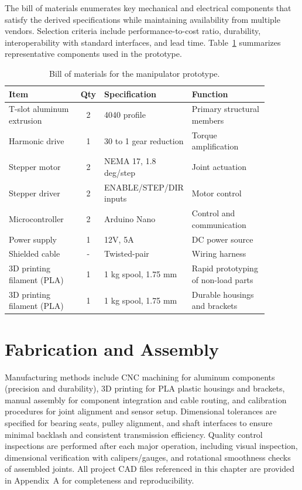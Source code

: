 The bill of materials enumerates key mechanical and electrical components that satisfy the derived specifications while maintaining
 availability from multiple vendors. Selection criteria include performance-to-cost ratio, durability, interoperability with standard 
 interfaces, and lead time. Table~\ref{tab:components_bom} summarizes representative components used in the prototype.

\begin{table}[H]
\centering
\caption{Bill of materials for the manipulator prototype.}
\label{tab:components_bom}
\begin{tabular}{|p{0.28\linewidth}|c|p{0.30\linewidth}|p{0.30\linewidth}|}
\hline
Item & Qty & Specification & Function \\
\hline
T-slot aluminum extrusion & 2 & 4040 profile & Primary structural members \\
Harmonic drive & 1 & 30 to 1 gear reduction & Torque amplification \\
Stepper motor & 2 & NEMA 17, 1.8 deg/step & Joint actuation \\
Stepper driver & 2 & ENABLE/STEP/DIR inputs & Motor control \\
Microcontroller & 2 & Arduino Nano & Control and communication \\
Power supply & 1 & 12V, 5A & DC power source \\
Shielded cable & - & Twisted-pair & Wiring harness \\
3D printing filament (PLA) & 1 & 1 kg spool, 1.75 mm & Rapid prototyping of non-load parts \\
3D printing filament (PLA) & 1 & 1 kg spool, 1.75 mm & Durable housings and brackets \\
\hline
\end{tabular}
\end{table}


\section{Fabrication and Assembly}
Manufacturing methods include CNC machining for aluminum components (precision and durability), 3D printing for PLA plastic housings and brackets, manual assembly for component integration and cable routing, and calibration procedures for joint alignment and sensor setup. Dimensional tolerances are specified for bearing seats, pulley alignment, and shaft interfaces to ensure minimal backlash and consistent transmission efficiency. Quality control inspections are performed after each major operation, including visual inspection, dimensional verification with calipers/gauges, and rotational smoothness checks of assembled joints. All project CAD files referenced in this chapter are provided in Appendix~A for completeness and reproducibility.

